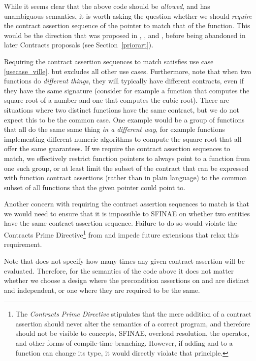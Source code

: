 While it seems clear that the above code should be \emph{allowed}, and has unambiguous semantics, it is worth asking the question whether we should \emph{require} the contract assertion sequence of the pointer to match that of the function. This would be the direction that was proposed in \cite{N4415}, \cite{P0287R0}, and \cite{P0380R0}, before being abandoned in later Contracts proposals (see Section~\ref{priorart}).

Requiring the contract assertion sequences to match satisfies use case \ref{usecase_ville}. but excludes all other use cases. Furthermore, note that when two functions do \emph{different things}, they will typically have different contracts, even if they have the same signature (consider for example a function that computes the square root of a number and one that computes the cubic root). There are situations where two distinct functions have the same contract, but we do not expect this to be the common case. One example would be a group of functions that all do the same same thing \emph{in a different way}, for example functions implementing different numeric algorithms to compute the square root that all offer the same guarantees. If we require the contract assertion sequences to match, we effectively restrict function pointers to always point to a function from one such group, or at least limit the subset of the contract that can be expressed with function contract assertions (rather than in plain language) to the common subset of all functions that the given pointer could point to.

Another concern with requiring the contract assertion sequences to match is that we would need to ensure that it is impossible to SFINAE on whether two entities have the same contract assertion sequence. Failure to do so would violate the Contracts Prime Directive\footnote{The \emph{Contracts Prime Directive} stipulates that the mere addition of a contract assertion should never alter the semantics of a correct program, and therefore should not be visible to concepts, SFINAE, overload resolution, the  operator, and other forms of compile-time branching. However, if adding  and  to a function can change its type, it would directly violate that principle.} from \cite{P2900R8} and impede future extensions that relax this requirement.

Note that \cite{P2900R8} does not specify how many times any given contract assertion will be evaluated. Therefore, for the semantics of the code above it does not matter whether we choose a design where the precondition assertions on  and  are distinct and independent, or one where they are required to be the same.

